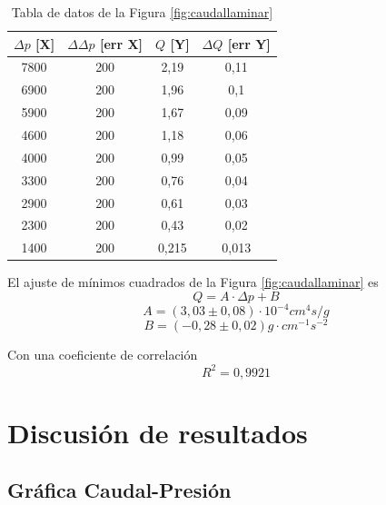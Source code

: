 \documentclass[a4paper,12pt,spanish]{article}
\begin{document}
	\begin{table}[H]
		\centering
		\begin{tabular}{|c|c|c|c|}
			\hline
			$\mathit{\Delta}p$ [X]& $\Delta\mathit{\Delta}p$ [err X] & $Q$ [Y]& $\Delta Q$ [err Y]\\ \hline\hline
			7800 & 200 & 2,19 & 0,11 \\ \hline
			6900 & 200 & 1,96 & 0,1 \\ \hline
			5900 & 200 & 1,67 & 0,09 \\ \hline
			4600 & 200 & 1,18 & 0,06 \\ \hline
			4000 & 200 & 0,99 & 0,05 \\ \hline
			3300 & 200 & 0,76 & 0,04 \\ \hline
			2900 & 200 & 0,61 & 0,03 \\ \hline
			2300 & 200 & 0,43 & 0,02 \\ \hline
			1400 & 200 & 0,215 & 0,013 \\ \hline
		\end{tabular}
		\caption{Tabla de datos de la Figura \ref{fig:caudallaminar}}
	\end{table}
	
	
	
	
	

	
	El ajuste de mínimos cuadrados de la Figura \ref{fig:caudallaminar} es
	\[ Q = A\cdot \mathit{\Delta }p + B
	\]
	\[ A = (3,03 \pm 0,08) \cdot 10^{-4} \si{cm^4 s / g}   %
	\]
	\[B = (-0,28 \pm 0,02) \si{g\cdot cm^{-1} s^{-2}}   %
	\]
	
	Con una coeficiente de correlación
	\[ R^2 = 0,9921
	\] 
	
	
	
	
	
	\section{Discusión de resultados} 
	
	\subsection*{Gráfica Caudal-Presión}
	
\end{document}

